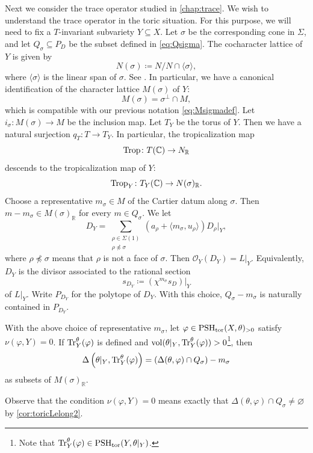 Next we consider the trace operator studied in \cref{chap:trace}. We wish to understand the trace operator in the toric situation.
For this purpose, we will need to fix a $T$-invariant subvariety $Y\subseteq X$. Let $\sigma$ be the corresponding cone in $\Sigma$, and let $Q_{\sigma}\subseteq P_D$ be the subset defined in \eqref{eq:Qsigma}.
The cocharacter lattice of $Y$ is given by
\[
N(\sigma)\coloneqq N/N\cap \langle \sigma \rangle,
\]
where $\langle \sigma \rangle$ is the linear span of $\sigma$. See \cite[(3.2.6)]{CLS11}. In particular, we have a canonical identification of the character lattice $M(\sigma)$ of $Y$:
\[
M(\sigma)=\sigma^{\perp}\cap M,
\]
which is compatible with our previous notation \eqref{eq:Msigmadef}.
Let $i_{\sigma}\colon M(\sigma)\rightarrow M$ be the inclusion map.
Let $T_Y$ be the torus of $Y$. Then we have a natural surjection $q_T\colon T\rightarrow T_Y$. In particular, the tropicalization map
\[
\operatorname{Trop}\colon T(\mathbb{C})\rightarrow N_{\mathbb{R}}
\]
descends to the tropicalization map of $Y$:
\[
\operatorname{Trop}_Y\colon T_Y(\mathbb{C})\rightarrow N(\sigma)_{\mathbb{R}}.
\]
Choose a representative $m_{\sigma}\in M$ of the Cartier datum along $\sigma$. Then $m-m_{\sigma}\in M(\sigma)_{\mathbb{R}}$ for every $m\in Q_{\sigma}$.
We let
\[
D_Y=\sum_{\substack{\rho\in \Sigma(1)\\ \rho\not\preceq\sigma}} \left(a_{\rho}+\langle m_{\sigma},u_{\rho}\rangle\right)D_{\rho}|_Y,
\]
where $\rho\not\preceq\sigma$ means that $\rho$ is not a face of $\sigma$. Then $\mathcal{O}_Y(D_Y)=L|_Y$.
Equivalently, $D_Y$ is the divisor associated to the rational section
\[
s_{D_Y}\coloneqq (\chi^{m_{\sigma}}s_D)|_Y
\]
of $L|_Y$. Write $P_{D_Y}$ for the polytope of $D_Y$. With this choice, $Q_{\sigma}-m_{\sigma}$ is naturally contained in $P_{D_Y}$.


\begin{theorem}\label{thm:tracetor}
With the above choice of representative $m_{\sigma}$, let $\varphi\in \mathrm{PSH}_{\mathrm{tor}}(X,\theta)_{>0}$ satisfy $\nu(\varphi,Y)=0$. If $\operatorname{Tr}_Y^{\theta}(\varphi)$ is defined and $\operatorname{vol} (\theta|_Y,\operatorname{Tr}_Y^{\theta}(\varphi))>0$\footnote{Note that $\operatorname{Tr}_Y^{\theta}(\varphi)\in \mathrm{PSH}_{\mathrm{tor}}(Y,\theta|_Y)$.}, then
\[
\Delta\left(\theta|_Y,\operatorname{Tr}_Y^{\theta}(\varphi)\right)= \left(\Delta(\theta,\varphi)\cap Q_{\sigma}\right)-m_{\sigma}
\]
as subsets of $M(\sigma)_{\mathbb{R}}$.
\end{theorem}
Observe that the condition $\nu(\varphi,Y)=0$ means exactly that $\Delta(\theta,\varphi)\cap Q_{\sigma}\neq \varnothing$ by \cref{cor:toricLelong2}.


